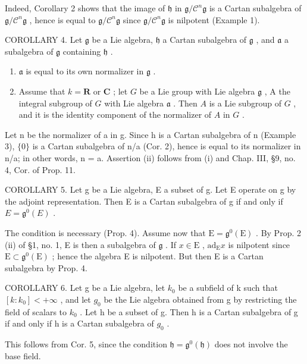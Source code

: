 Indeed, Corollary 2 shows that the image of \(\mathfrak{h}\) in \(\mathfrak{g} / \mathcal{C}^n\mathfrak{g}\) is a Cartan subalgebra of \(\mathfrak{g} / \mathcal{C}^n\mathfrak{g}\) , hence is equal to \(\mathfrak{g} / \mathcal{C}^n\mathfrak{g}\) since \(\mathfrak{g} / \mathcal{C}^n\mathfrak{g}\) is nilpotent (Example 1).

COROLLARY 4. Let \(\mathfrak{g}\) be a Lie algebra, \(\mathfrak{h}\) a Cartan subalgebra of \(\mathfrak{g}\) , and \(\mathfrak{a}\) a subalgebra of \(\mathfrak{g}\) containing \(\mathfrak{h}\) .

\begin{enumerate}
\def\labelenumi{(\roman{enumi})}
\item
  \(\mathfrak{a}\) is equal to its own normalizer in \(\mathfrak{g}\) .
\item
  Assume that \(k = \mathbf{R}\) or \(\mathbf{C}\) ; let \(G\) be a Lie group with Lie algebra \(\mathfrak{g}\) , A the integral subgroup of \(G\) with Lie algebra \(\mathfrak{a}\) . Then \(A\) is a Lie subgroup of \(G\) , and it is the identity component of the normalizer of \(A\) in \(G\) .
\end{enumerate}

Let n be the normalizer of a in g. Since h is a Cartan subalgebra of n (Example 3), \(\{0\}\) is a Cartan subalgebra of n/a (Cor. 2), hence is equal to its normalizer in n/a; in other words, n = a. Assertion (ii) follows from (i) and Chap. III, §9, no. 4, Cor. of Prop. 11.

COROLLARY 5. Let g be a Lie algebra, E a subset of g. Let E operate on g by the adjoint representation. Then E is a Cartan subalgebra of g if and only if \(E = \mathfrak{g}^{0}(E)\) .

The condition is necessary (Prop. 4). Assume now that \(\mathrm{E} = \mathfrak{g}^0 (\mathrm{E})\) . By Prop. 2 (ii) of §1, no. 1, E is then a subalgebra of \(\mathfrak{g}\) . If \(x\in \mathrm{E}\) , \(\mathrm{ad}_{\mathrm{E}}x\) is nilpotent since \(\mathrm{E}\subset \mathfrak{g}^0 (\mathrm{E})\) ; hence the algebra E is nilpotent. But then E is a Cartan subalgebra by Prop. 4.

COROLLARY 6. Let g be a Lie algebra, let \(k_{0}\) be a subfield of k such that \([k:k_{0}]<+\infty\) , and let \(g_{0}\) be the Lie algebra obtained from g by restricting the field of scalars to \(k_{0}\) . Let h be a subset of g. Then h is a Cartan subalgebra of g if and only if h is a Cartan subalgebra of \(g_{0}\) .

This follows from Cor. 5, since the condition \(\mathfrak{h} = \mathfrak{g}^0 (\mathfrak{h})\) does not involve the base field.

